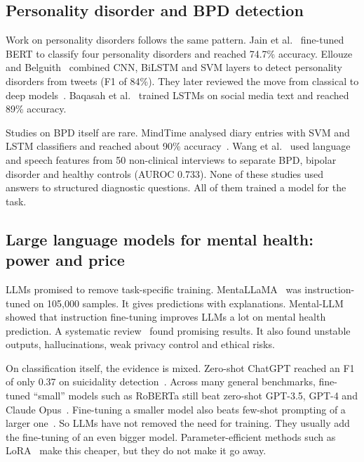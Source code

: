 \documentclass[11pt]{article}
\begin{document}
\subsection{Personality disorder and BPD detection}

Work on personality disorders follows the same pattern. Jain et al.~\cite{jain2024} fine-tuned BERT
to classify four personality disorders and reached 74.7\% accuracy. Ellouze and
Belguith~\cite{ellouze2022hybrid,ellouze2022deep} combined CNN, BiLSTM and SVM layers to detect
personality disorders from tweets (F1 of 84\%). They later reviewed the move from classical to deep
models~\cite{ellouze2024artificial}. Baqasah et al.~\cite{baqasah2024personality} trained LSTMs on
social media text and reached 89\% accuracy.

Studies on BPD itself are rare. MindTime analysed diary entries with SVM and LSTM classifiers and
reached about 90\% accuracy~\cite{khazbak2021mindtime}. Wang et al.~\cite{wang2020learning} used
language and speech features from 50 non-clinical interviews to separate BPD, bipolar disorder and
healthy controls (AUROC 0.733). None of these studies used answers to structured diagnostic
questions. All of them trained a model for the task.

\subsection{Large language models for mental health: power and price}

LLMs promised to remove task-specific training. MentaLLaMA~\cite{yang2024mentallama} was
instruction-tuned on 105,000 samples. It gives predictions with explanations. Mental-LLM~\cite{xu2024mental}
showed that instruction fine-tuning improves LLMs a lot on mental health prediction. A systematic
review~\cite{guo2024llmreview} found promising results. It also found unstable outputs,
hallucinations, weak privacy control and ethical risks.

On classification itself, the evidence is mixed. Zero-shot ChatGPT reached an F1 of only 0.37 on
suicidality detection~\cite{lamichhane2023chatgpt}. Across many general benchmarks, fine-tuned
``small'' models such as RoBERTa still beat zero-shot GPT-3.5, GPT-4 and Claude
Opus~\cite{bucher2024finetuned}. Fine-tuning a smaller model also beats few-shot prompting of a
larger one~\cite{edwards2024icl}. So LLMs have not removed the need for training. They usually
add the fine-tuning of an even bigger model. Parameter-efficient methods such as
LoRA~\cite{hu2022lora} make this cheaper, but they do not make it go away.
\end{document}
